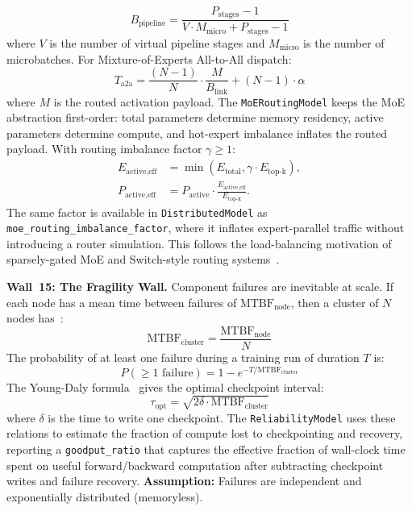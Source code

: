 \documentclass[10pt,twocolumn]{article}
\begin{document}
\begin{equation}
\label{eq:bubble}
B_{\text{pipeline}} = \frac{P_{\text{stages}} - 1}{V \cdot M_{\text{micro}} + P_{\text{stages}} - 1}
\end{equation}
where $V$ is the number of virtual pipeline stages and $M_{\text{micro}}$ is the number of microbatches. For Mixture-of-Experts All-to-All dispatch:
\begin{equation}
\label{eq:alltoall}
T_{\text{a2a}} = \frac{(N-1)}{N} \cdot \frac{M}{B_{\text{link}}} + (N-1) \cdot \alpha
\end{equation}
where $M$ is the routed activation payload. The \texttt{MoERoutingModel} keeps the MoE abstraction first-order: total parameters determine memory residency, active parameters determine compute, and hot-expert imbalance inflates the routed payload. With routing imbalance factor $\gamma \ge 1$:
\begin{align}
\label{eq:moe-imbalance}
E_{\text{active,eff}} &= \min(E_{\text{total}}, \gamma \cdot E_{\text{top-k}}), \\
P_{\text{active,eff}} &= P_{\text{active}} \cdot
\frac{E_{\text{active,eff}}}{E_{\text{top-k}}}.
\end{align}
The same factor is available in \texttt{DistributedModel} as \texttt{moe\_routing\_imbalance\_factor}, where it inflates expert-parallel traffic without introducing a router simulation. This follows the load-balancing motivation of sparsely-gated MoE and Switch-style routing systems~\citep{shazeer2017outrageously,fedus2022switch,lepikhin2020gshard}.

\textbf{Wall~15: The Fragility Wall.} Component failures are inevitable at scale. If each node has a mean time between failures of $\text{MTBF}_{\text{node}}$, then a cluster of $N$ nodes has~\citep{daly2006}:
\begin{equation}
\label{eq:mtbf}
\text{MTBF}_{\text{cluster}} = \frac{\text{MTBF}_{\text{node}}}{N}
\end{equation}
The probability of at least one failure during a training run of duration $T$ is:
\begin{equation}
\label{eq:pfail}
P(\geq 1 \text{ failure}) = 1 - e^{-T / \text{MTBF}_{\text{cluster}}}
\end{equation}
The Young-Daly formula~\citep{young1974, daly2006} gives the optimal checkpoint interval:
\begin{equation}
\label{eq:youngdaly}
\tau_{\text{opt}} = \sqrt{2 \delta \cdot \text{MTBF}_{\text{cluster}}}
\end{equation}
where $\delta$ is the time to write one checkpoint. The \texttt{ReliabilityModel} uses these relations to estimate the fraction of compute lost to checkpointing and recovery, reporting a \texttt{goodput\_ratio} that captures the effective fraction of wall-clock time spent on useful forward/backward computation after subtracting checkpoint writes and failure recovery. \textbf{Assumption:} Failures are independent and exponentially distributed (memoryless).
\end{document}
